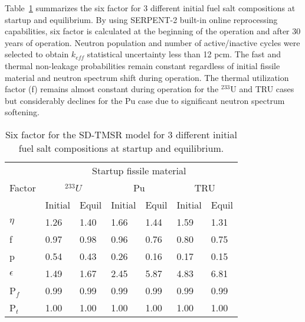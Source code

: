 Table~\ref{tab:six_factor} summarizes the six factor for 3 different initial 
fuel salt compositions at startup and equilibrium. By using SERPENT-2 built-in 
online reprocessing capabilities, six factor is calculated at the 
beginning of the operation and after 30 years of operation. Neutron population 
and number of active/inactive cycles were selected to obtain $k_{eff}$ 
statistical uncertainty less than 12 pcm. The fast and thermal non-leakage 
probabilities remain constant regardless of initial fissile material and 
neutron spectrum shift during operation. The thermal utilization factor (f) 
remains almost constant during operation for the $^{233}$U and TRU cases but 
considerably declines for the Pu case due to significant neutron spectrum 
softening.
\begin{table} [ht!]
	\caption{Six factor for the SD-TMSR model for 3 different initial 
		fuel salt compositions at startup and equilibrium.}
	\begin{tabularx}{\textwidth}{ X | X X  X X  X X } \hline
		\multirow{3}{*}{Factor}  & \multicolumn{6}{c}{Startup fissile 
			material} \\ \cline{2-7}
		\space  & \multicolumn{2}{c}{$^{233}U$} & \multicolumn{2}{c}{Pu} & 
		\multicolumn{2}{c}{TRU} \\ \cline{2-7}
		\space  & Initial & Equil & Initial & Equil & Initial & Equil \\ \hline
		$\eta$  & 1.26 & 1.40 & 1.66 & 1.44 & 1.59 & 1.31 \\ 
		f       & 0.97 & 0.98 & 0.96 & 0.76 & 0.80 & 0.75 \\
		p       & 0.54 & 0.43 & 0.26 & 0.16 & 0.17 & 0.15 \\
		$\epsilon$ & 1.49 & 1.67 & 2.45 & 5.87 & 4.83 & 6.81 \\
		P$_f$   & 0.99 & 0.99 & 0.99 & 0.99& 0.99 & 0.99 \\
		P$_t$   & 1.00 & 1.00 & 1.00 & 1.00 & 1.00 & 1.00 \\ \hline
	\end{tabularx}
	\label{tab:six_factor}
\end{table}

